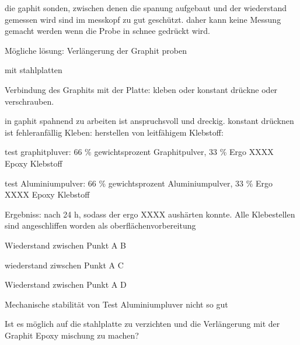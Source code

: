 die gaphit sonden, zwischen denen die spanung aufgebaut und der wiederstand gemessen wird sind im messkopf zu gut geschützt. daher kann keine Messung gemacht werden wenn die Probe in schnee gedrückt wird.

Mögliche lösung: Verlängerung der Graphit proben

mit stahlplatten

Verbindung des Graphits mit der Platte: kleben oder konstant drückne oder verschrauben.

in gaphit spahnend zu arbeiten ist anspruchsvoll und dreckig.
konstant drücknen ist fehleranfällig
Kleben: herstellen von leitfähigem Klebstoff:

test graphitpluver: 66 \% gewichtsprozent Graphitpulver, 33 \% Ergo XXXX Epoxy Klebstoff

test Aluminiumpulver: 66 \% gewichtsprozent Aluminiumpulver, 33 \% Ergo XXXX Epoxy Klebstoff


Ergebniss: nach 24 h, sodass der ergo XXXX aushärten konnte.
Alle Klebestellen sind angeschliffen worden als oberflächenvorbereitung

Wiederstand zwischen Punkt A B

wiederstand ziwschen Punkt A C

Wiederstand zwischen Punkt A D

Mechanische stabilität von Test Aluminiumpluver nicht so gut

Ist es möglich auf die stahlplatte zu verzichten und die Verlängerung mit der Graphit Epoxy mischung zu machen?
